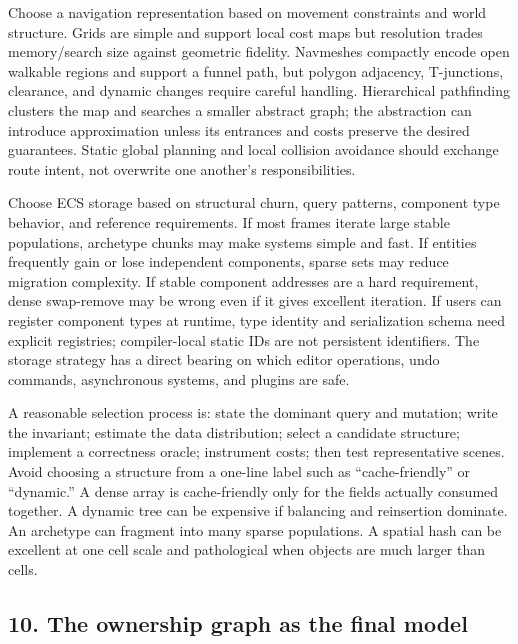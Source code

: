 Choose a navigation representation based on movement constraints and world structure. Grids are simple and support local cost maps but resolution trades memory/search size against geometric fidelity. Navmeshes compactly encode open walkable regions and support a funnel path, but polygon adjacency, T-junctions, clearance, and dynamic changes require careful handling. Hierarchical pathfinding clusters the map and searches a smaller abstract graph; the abstraction can introduce approximation unless its entrances and costs preserve the desired guarantees. Static global planning and local collision avoidance should exchange route intent, not overwrite one another's responsibilities.

Choose ECS storage based on structural churn, query patterns, component type behavior, and reference requirements. If most frames iterate large stable populations, archetype chunks may make systems simple and fast. If entities frequently gain or lose independent components, sparse sets may reduce migration complexity. If stable component addresses are a hard requirement, dense swap-remove may be wrong even if it gives excellent iteration. If users can register component types at runtime, type identity and serialization schema need explicit registries; compiler-local static IDs are not persistent identifiers. The storage strategy has a direct bearing on which editor operations, undo commands, asynchronous systems, and plugins are safe.

A reasonable selection process is: state the dominant query and mutation; write the invariant; estimate the data distribution; select a candidate structure; implement a correctness oracle; instrument costs; then test representative scenes. Avoid choosing a structure from a one-line label such as ``cache-friendly'' or ``dynamic.'' A dense array is cache-friendly only for the fields actually consumed together. A dynamic tree can be expensive if balancing and reinsertion dominate. An archetype can fragment into many sparse populations. A spatial hash can be excellent at one cell scale and pathological when objects are much larger than cells.

\subsection{10. The ownership graph as the final model}\label{05-engine-i-ch008-the-ownership-graph-as-the-final-model}

\hypertarget{05-engine-i-ch008-the-ownership-graph-as-the-final-model}{}

